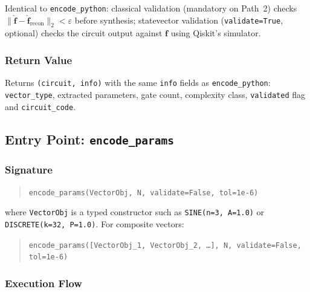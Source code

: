 \documentclass[10pt,twocolumn]{article}
\begin{document}
Identical to \texttt{encode\_python}: classical
validation (mandatory on Path~2) checks
$\|\hat{\mathbf{f}}-\hat{\mathbf{f}}_\mathrm{recon}\|_2
< \varepsilon$ before synthesis; statevector validation
(\texttt{validate=True}, optional) checks the circuit
output against $\mathbf{f}$ using Qiskit's simulator.

\subsubsection*{Return Value}

Returns \texttt{(circuit, info)} with the same
\texttt{info} fields as \texttt{encode\_python}:
\texttt{vector\_type}, extracted parameters, gate count,
complexity class, \texttt{validated} flag and \texttt{circuit\_code}.

\subsection{Entry Point: \texttt{encode\_params}}
\label{app:encode_params}

\subsubsection*{Signature}

\begin{quote}
\texttt{encode\_params(VectorObj, N, validate=False, tol=1e-6)}
\end{quote}
where \texttt{VectorObj} is a typed constructor such as
\texttt{SINE(n=3, A=1.0)} or \texttt{DISCRETE(k=32, P=1.0)}.
For composite vectors:
\begin{quote}
\texttt{encode\_params([VectorObj\_1, VectorObj\_2, \ldots], N, validate=False, tol=1e-6)}
\end{quote}

\subsubsection*{Execution Flow}
\end{document}
